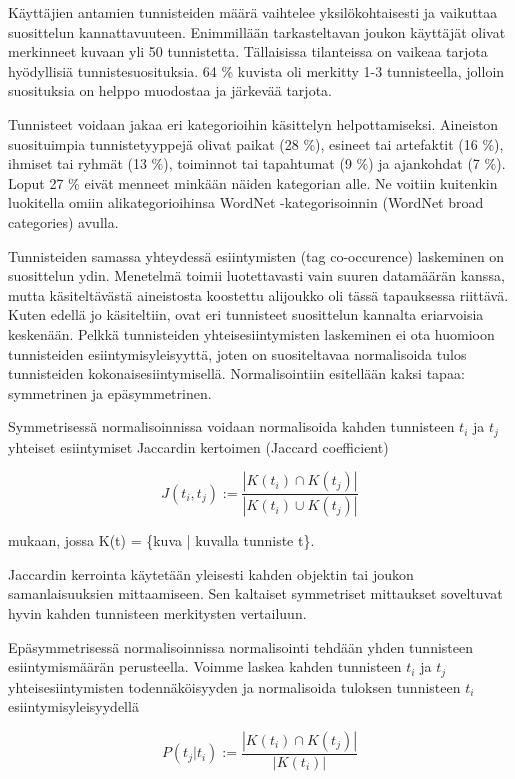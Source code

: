 \documentclass[12pt,finnish]{tktltiki2}
\theoremstyle{definition}
\theoremstyle{remark}
\begin{document}
Käyttäjien antamien tunnisteiden määrä vaihtelee yksilökohtaisesti ja vaikuttaa suosittelun kannattavuuteen. Enimmillään tarkasteltavan joukon käyttäjät olivat merkinneet kuvaan yli 50 tunnistetta. Tällaisissa tilanteissa on vaikeaa tarjota hyödyllisiä tunnistesuosituksia. 64 \% kuvista oli merkitty 1-3 tunnisteella, jolloin suosituksia on helppo muodostaa ja järkevää tarjota.

Tunnisteet voidaan jakaa eri kategorioihin käsittelyn helpottamiseksi. Aineiston suosituimpia tunnistetyyppejä olivat paikat (28 \%), esineet tai artefaktit (16 \%), ihmiset tai ryhmät (13 \%), toiminnot tai tapahtumat (9 \%) ja ajankohdat (7 \%). Loput 27 \% eivät menneet minkään näiden kategorian alle. Ne voitiin kuitenkin luokitella omiin alikategorioihinsa WordNet -kategorisoinnin (WordNet broad categories) avulla.

Tunnisteiden samassa yhteydessä esiintymisten (tag co-occurence) laskeminen on suosittelun ydin. Menetelmä toimii luotettavasti vain suuren datamäärän kanssa, mutta käsiteltävästä aineistosta koostettu alijoukko oli tässä tapauksessa riittävä. Kuten edellä jo käsiteltiin, ovat eri tunnisteet suosittelun kannalta eriarvoisia keskenään. Pelkkä tunnisteiden yhteisesiintymisten laskeminen ei ota huomioon tunnisteiden esiintymisyleisyyttä, joten on suositeltavaa normalisoida tulos tunnisteiden kokonaisesiintymisellä. Normalisointiin esitellään kaksi tapaa: symmetrinen ja epäsymmetrinen.

Symmetrisessä normalisoinnissa voidaan normalisoida kahden tunnisteen $t_{i}$ ja $t_{j}$ yhteiset esiintymiset Jaccardin kertoimen (Jaccard coefficient)

\begin{displaymath}
J (t_{i}, t_{j}):= \frac{|K(t_{i}) \cap K(t_{j})|} {|K(t_{i}) \cup K(t_{j})|}
\end{displaymath}

mukaan, jossa K(t) = \{kuva | kuvalla tunniste t\}.

Jaccardin kerrointa käytetään yleisesti kahden objektin tai joukon samanlaisuuksien mittaamiseen. Sen kaltaiset symmetriset mittaukset soveltuvat hyvin kahden tunnisteen merkitysten vertailuun.

Epäsymmetrisessä normalisoinnissa normalisointi tehdään yhden tunnisteen esiintymismäärän perusteella. Voimme laskea kahden tunnisteen $t_{i}$ ja $t_{j}$ yhteisesiintymisten todennäköisyyden ja normalisoida tuloksen tunnisteen $t_{i}$ esiintymisyleisyydellä 

\begin{displaymath}
P (t_{j} | t_{i}):= \frac{|K(t_{i}) \cap K(t_{j})|} {|K(t_{i})|}
\end{displaymath}
\end{document}
